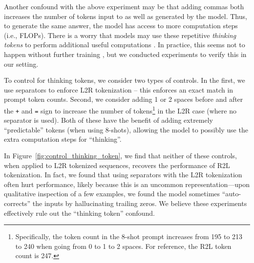 \documentclass{article}
\theoremstyle{plain}
\theoremstyle{definition}
\theoremstyle{remark}
\begin{document}
Another confound with the above experiment may be that adding commas both increases the number of tokens input to as well as generated by the model. Thus, to generate the same answer, the model has access to more computation steps (i.e., FLOPs). There is a worry that models may use these repetitive \textit{thinking tokens} to perform additional useful computations \citep{lanham2023faithfulness}. In practice, this seems not to happen without further training \citep{goyal2024pause}, but we conducted experiments to verify this in our setting.

To control for thinking tokens, we consider two types of controls. In the first, we use separators to enforce L2R tokenization -- this enforces an exact match in prompt token counts. Second, we consider adding 1 or 2 spaces before and after the \texttt{+} and \texttt{=} sign to increase the number of tokens\footnote{Specifically, the token count in the 8-shot prompt increases from 195 to 213 to 240 when going from 0 to 1 to 2 spaces. For reference, the R2L token count is 247.} in the L2R case (where no separator is used). Both of these have the benefit of adding extremely ``predictable'' tokens (when using 8-shots), allowing the model to possibly use the extra computation steps for ``thinking''.

In Figure~\ref{fig:control_thinking_token}, we find that neither of these controls, when applied to L2R tokenized sequences, recovers the performance of R2L tokenization. In fact, we found that using separators with the L2R tokenization often hurt performance, likely because this is an uncommon representation---upon qualitative inspection of a few examples, we found the model sometimes ``auto-corrects'' the inputs by hallucinating trailing zeros. We believe these experiments effectively rule out the ``thinking token'' confound.
\end{document}
